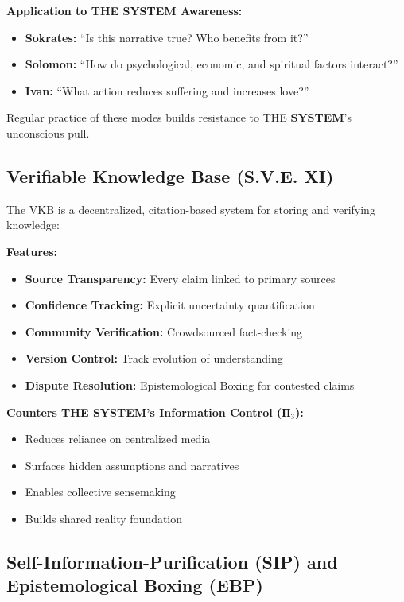 \documentclass[11pt,a4paper]{article}
\newcommand{\SYSTEM}{\textbf{SYSTEM}}
\theoremstyle{definition}
\theoremstyle{remark}
\begin{document}
\textbf{Application to THE \SYSTEM{} Awareness:}
\begin{itemize}
    \item \textbf{Sokrates:} ``Is this narrative true? Who benefits from it?''
    \item \textbf{Solomon:} ``How do psychological, economic, and spiritual factors interact?''
    \item \textbf{Ivan:} ``What action reduces suffering and increases love?''
\end{itemize}

Regular practice of these modes builds resistance to THE \SYSTEM{}'s unconscious pull.

\subsection{Verifiable Knowledge Base (S.V.E. XI)}

The VKB \cite{sve11} is a decentralized, citation-based system for storing and verifying knowledge:

\textbf{Features:}
\begin{itemize}
    \item \textbf{Source Transparency:} Every claim linked to primary sources
    \item \textbf{Confidence Tracking:} Explicit uncertainty quantification
    \item \textbf{Community Verification:} Crowdsourced fact-checking
    \item \textbf{Version Control:} Track evolution of understanding
    \item \textbf{Dispute Resolution:} Epistemological Boxing for contested claims
\end{itemize}

\textbf{Counters THE \SYSTEM{}'s Information Control (П$_3$):}
\begin{itemize}
    \item Reduces reliance on centralized media
    \item Surfaces hidden assumptions and narratives
    \item Enables collective sensemaking
    \item Builds shared reality foundation
\end{itemize}

\subsection{Self-Information-Purification (SIP) and Epistemological Boxing (EBP)}
\end{document}
